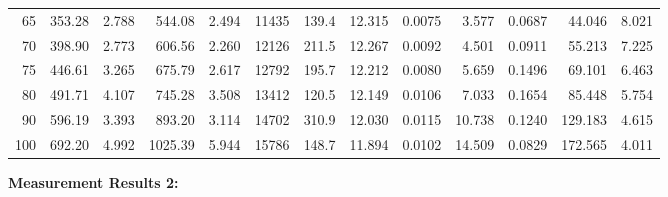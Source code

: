 \documentclass[10pt]{article}
\begin{document}
{\begin{tabular}{|r|rr|rr|rr|rr|rr|r|r|}
       65 &       353.28 &        2.788 &       544.08 &        2.494 &        11435 &        139.4 &       12.315 &       0.0075 &        3.577 &       0.0687 &       44.046 &        8.021 \\
       70 &       398.90 &        2.773 &       606.56 &        2.260 &        12126 &        211.5 &       12.267 &       0.0092 &        4.501 &       0.0911 &       55.213 &        7.225 \\
       75 &       446.61 &        3.265 &       675.79 &        2.617 &        12792 &        195.7 &       12.212 &       0.0080 &        5.659 &       0.1496 &       69.101 &        6.463 \\
       80 &       491.71 &        4.107 &       745.28 &        3.508 &        13412 &        120.5 &       12.149 &       0.0106 &        7.033 &       0.1654 &       85.448 &        5.754 \\
       90 &       596.19 &        3.393 &       893.20 &        3.114 &        14702 &        310.9 &       12.030 &       0.0115 &       10.738 &       0.1240 &      129.183 &        4.615 \\
      100 &       692.20 &        4.992 &      1025.39 &        5.944 &        15786 &        148.7 &       11.894 &       0.0102 &       14.509 &       0.0829 &      172.565 &        4.011 \\
\hline
\end{tabular}
}

\vspace{3mm}

\noindent
{\large \bf Measurement Results 2:}
\vspace{3mm}
\end{document}
